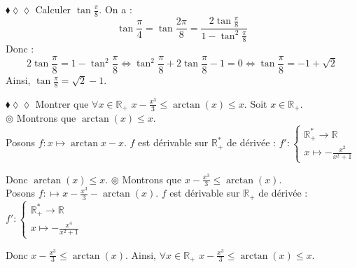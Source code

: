 \documentclass[11pt]{article}
\begin{document}
\begin{exercice}{$\blacklozenge\lozenge\lozenge$}{}
    Calculer $\tan\frac{\pi}{8}$.
    \tcblower
    On a :
    \begin{equation*}
        \tan\frac{\pi}{4}=\tan\frac{2\pi}{8}=\frac{2\tan\frac{\pi}{8}}{1-\tan^2\frac{\pi}{8}}
    \end{equation*}
    Donc : 
    \begin{equation*}
        2\tan\frac{\pi}{8}=1-\tan^2\frac{\pi}{8}
        \iff \tan^2\frac{\pi}{8}+2\tan\frac{\pi}{8}-1=0
        \iff \tan\frac{\pi}{8}=-1+\sqrt{2}
    \end{equation*}
    Ainsi, $\tan\frac{\pi}{8}=\sqrt{2}-1$.
\end{exercice}

\begin{exercice}{$\blacklozenge\lozenge\lozenge$}{}
    Montrer que $\forall{x\in\mathbb{R}_+}$ $x-\frac{x^3}{3}\leq\arctan(x)\leq x$.
    \tcblower
    Soit $x\in\mathbb{R}_+$.\\
    $\circledcirc$ Montrons que $\arctan(x)\leq x$.\\
    Posons $f:x\mapsto\arctan{x}-x$. $f$ est dérivable sur $\mathbb{R}^*_+$ de dérivée : $f':\begin{cases}\mathbb{R}^*_+\rightarrow\mathbb{R}\\x\mapsto-\frac{x^2}{x^2+1}\end{cases}$
    \begin{center}
    \end{center}
    Donc $\arctan(x)\leq x$.\n
    $\circledcirc$ Montrons que $x-\frac{x^3}{3}\leq\arctan(x)$.\\
    Posons $f:\mapsto x-\frac{x^3}{3}-\arctan(x)$. $f$ est dérivable sur $\mathbb{R}_+$ de dérivée : $f':\begin{cases}\mathbb{R}^*_+\rightarrow\mathbb{R}\\x\mapsto-\frac{x^4}{x^2+1}\end{cases}$
    \begin{center}
    \end{center}
    Donc $x-\frac{x^3}{3}\leq \arctan(x)$.\n
    Ainsi, $\forall{x\in\mathbb{R}_+}$ $x-\frac{x^3}{3}\leq\arctan(x)\leq x$.
\end{exercice}
\end{document}

